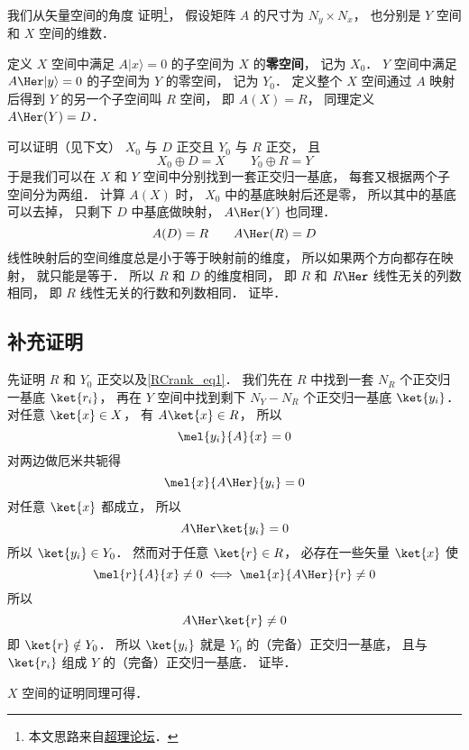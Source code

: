 

我们从矢量空间的角度 证明\footnote{本文思路来自\href{https://chaoli.club/index.php/4821}{超理论坛}．}， 假设矩阵 $A$ 的尺寸为 $N_y \times N_x$， 也分别是 $Y$ 空间和 $X$ 空间的维数．

定义 $X$ 空间中满足 $A |x\rangle = 0$ 的子空间为 $X$ 的\textbf{零空间}， 记为 $X_0$． $Y$ 空间中满足 $A\Her |y\rangle = 0$ 的子空间为 $Y$ 的零空间， 记为 $Y_0$． 定义整个 $X$ 空间通过 $A$ 映射后得到 $Y$ 的另一个子空间叫 $R$ 空间， 即 $A(X) = R$， 同理定义 $A\Her(Y) = D$． %

可以证明（见下文） $X_0$ 与 $D$ 正交且 $Y_0$ 与 $R$ 正交， 且
\begin{equation}\label{RCrank_eq1}
X_0 \oplus D = X
\qquad
Y_0 \oplus R = Y
\end{equation}
于是我们可以在 $X$ 和 $Y$ 空间中分别找到一套正交归一基底， 每套又根据两个子空间分为两组． 计算 $A(X)$ 时， $X_0$ 中的基底映射后还是零， 所以其中的基底可以去掉， 只剩下 $D$ 中基底做映射， $A\Her(Y)$ 也同理．
\begin{equation}
A(D) = R
\qquad
A\Her(R) = D
\end{equation}
线性映射后的空间维度总是小于等于映射前的维度， 所以如果两个方向都存在映射， 就只能是等于． 所以 $R$ 和 $D$ 的维度相同， 即 $R$ 和 $R\Her$ 线性无关的列数相同， 即 $R$ 线性无关的行数和列数相同． 证毕．

\subsection{补充证明}
先证明 $R$ 和 $Y_0$ 正交以及\autoref{RCrank_eq1}． 我们先在 $R$ 中找到一套 $N_R$ 个正交归一基底 $\ket{r_i}$， 再在 $Y$ 空间中找到剩下 $N_Y - N_R$ 个正交归一基底 $\ket{y_i}$． 对任意 $\ket{x} \in X$， 有 $A \ket{x} \in R$， 所以
\begin{equation}
\mel{y_i}{A}{x} = 0
\end{equation}
对两边做厄米共轭得%
\begin{equation}
\mel{x}{A\Her}{y_i} = 0
\end{equation}
对任意 $\ket{x}$ 都成立， 所以
\begin{equation}
A\Her\ket{y_i} = 0
\end{equation}
所以 $\ket{y_i} \in Y_0$． 然而对于任意 $\ket{r} \in R$， 必存在一些矢量 $\ket{x}$ 使
\begin{equation}
\mel{r}{A}{x} \ne 0
\iff
\mel{x}{A\Her}{r} \ne 0
\end{equation}
所以
\begin{equation}
A\Her\ket{r} \ne 0
\end{equation}
即 $\ket{r} \notin Y_0$． 所以 $\ket{y_i}$ 就是 $Y_0$ 的（完备）正交归一基底， 且与 $\ket{r_i}$ 组成 $Y$ 的（完备）正交归一基底． 证毕．

$X$ 空间的证明同理可得．

